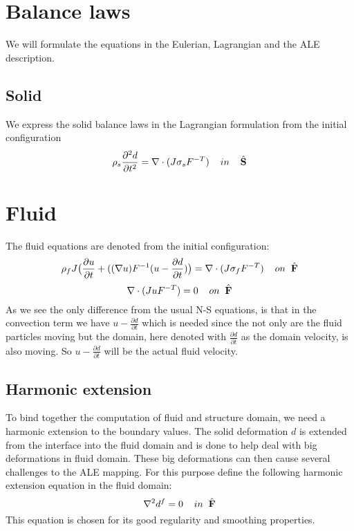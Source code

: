 \section*{Balance laws}
We will formulate the equations in the Eulerian, Lagrangian and the ALE description.

\subsection*{Solid}
We express the solid balance laws in the Lagrangian formulation from the initial configuration
$$\rho_s \frac{\partial^2 d}{\partial t^2} = \nabla \cdot (J \sigma_s F^{-T}) \hspace{4mm}in\hspace{4mm} \mathcal{\hat{S}} $$

\section*{Fluid}
The fluid equations are denoted from the initial configuration:
$$ \rho_f J \big( \frac{\partial u}{\partial t} + ((\nabla u)F^{-1}(u-\frac{\partial d}{\partial t})\big) = \nabla \cdot (J\sigma_f F^{-T} )\hspace{4mm} on \hspace{2mm} \mathcal{\hat{F}}$$
$$ \nabla \cdot (J u F^{-T}) = 0 \hspace{4mm} on \hspace{2mm} \mathcal{\hat{F}}$$
As we see the only difference from the usual N-S equations, is that in the convection term we have $u-\frac{\partial d}{\partial t} $ which is needed since the not only are the fluid particles moving but the domain, here denoted with $\frac{\partial d}{\partial t}$ as the domain velocity, is also moving. So $u-\frac{\partial d}{\partial t}$ will be the actual fluid velocity. 

\subsection*{Harmonic extension}
To bind together the computation of fluid and structure domain, we need a harmonic extension to the boundary values. The solid deformation $d$ is extended from the interface into the fluid domain and is done to help deal with big deformations in fluid domain. These big deformations can then cause several challenges to the ALE mapping. 
For this purpose define the following harmonic extension equation in the fluid domain:
$$ \nabla^2 d^f = 0\hspace{4mm}in \hspace{2mm} \mathcal{\hat{F}}$$ 
This equation is chosen for its good regularity and smoothing properties.

